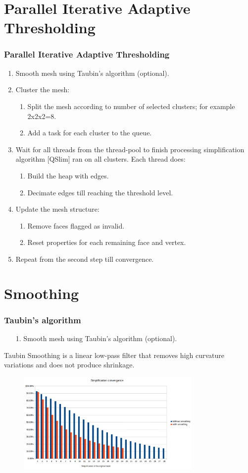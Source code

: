 \documentclass[
	10pt,
	t		%
]{beamer}
\begin{document}
\section{Parallel Iterative Adaptive Thresholding}
\begin{frame}
\frametitle{Parallel Iterative Adaptive Thresholding}
\centering
\begin{enumerate}
\item Smooth mesh using Taubin's algorithm (optional).
\item Cluster the mesh:
\begin{enumerate}
\item Split the mesh according to number of selected clusters; for example 2x2x2=8.
\item Add a task for each cluster to the queue.
\end{enumerate}
\item Wait for all threads from the thread-pool to finish processing simplification algorithm [QSlim] ran on all clusters. Each thread does:
\begin{enumerate}
\item Build the heap with edges.
\item Decimate edges till reaching the threshold level.
\end{enumerate}
\item Update the mesh structure:
\begin{enumerate}
\item Remove faces flagged as invalid.
\item Reset properties for each remaining face and vertex.
\end{enumerate}
\item Repeat from the second step till convergence.
\end{enumerate}
\end{frame}

\section{Smoothing}
\begin{frame}
\frametitle{Taubin's algorithm}
\centering
\begin{enumerate}
\item [1.] Smooth mesh using Taubin's algorithm (optional).
\end{enumerate}
Taubin Smoothing is a linear low-pass filter that removes high curvature variations and does not produce shrinkage.
\begin{figure}[ht]
\centering
\includegraphics[width=0.8\textwidth]{convergance}
\end{figure}
\end{frame}
\end{document}
